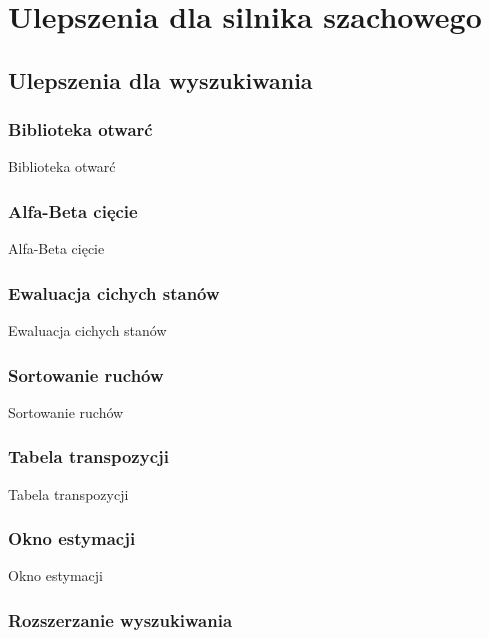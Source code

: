 
\chapter{Ulepszenia dla silnika szachowego}
\label{ch:implementacja-silnika-szachowego}



\section{Ulepszenia dla wyszukiwania}
\label{sec:ulepszenia-dla-wyszukiwania}

\subsection{Biblioteka otwarć}
\label{subsec:biblioteka-otwarc}

Biblioteka otwarć

\subsection{Alfa-Beta cięcie}
\label{subsec:alfa-beta-ciecie}

Alfa-Beta cięcie

\subsection{Ewaluacja cichych stanów}
\label{subsec:ewaluacja-cichych-stanow}

Ewaluacja cichych stanów

\subsection{Sortowanie ruchów}
\label{subsec:sortowanie-ruchow}

Sortowanie ruchów

\subsection{Tabela transpozycji}
\label{subsec:tabela-transpozycji}

Tabela transpozycji

\subsection{Okno estymacji}
\label{subsec:okno-estymacji}

Okno estymacji

\subsection{Rozszerzanie wyszukiwania}
\label{subsec:rozszerzanie-wyszukiwania}

